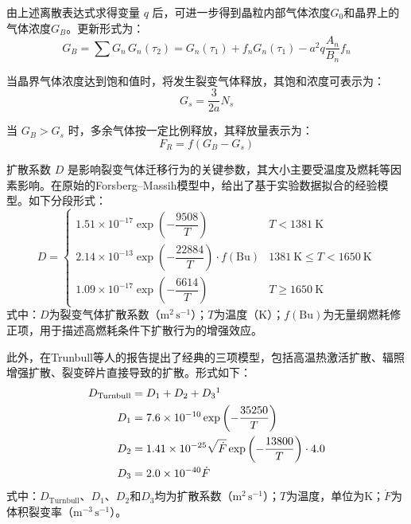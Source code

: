 由上述离散表达式求得变量 $q$ 后，可进一步得到晶粒内部气体浓度$G_0$和晶界上的气体浓度$G_B$。更新形式为：
\begin{equation}
	G_B = \sum G_n \, G_n(\tau_2) = G_n(\tau_1) + f_n G_n(\tau_1) - a^2 q \frac{A_n}{B_n} f_n
\end{equation}

当晶界气体浓度达到饱和值时，将发生裂变气体释放，其饱和浓度可表示为：
\begin{equation}
	G_s = \frac{3}{2a} N_s
\end{equation}

当 $G_B > G_s$ 时，多余气体按一定比例释放，其释放量表示为：
\begin{equation}
	F_R = f \left(G_B - G_s\right)
\end{equation}

扩散系数 $D$ 是影响裂变气体迁移行为的关键参数，其大小主要受温度及燃耗等因素影响。在原始的Forsberg--Massih模型中，给出了基于实验数据拟合的经验模型。如下分段形式：
\begin{equation}
	D =
	\begin{cases}
		1.51\times10^{-17}\exp\left(-\dfrac{9508}{T}\right)                      & T < 1381~\mathrm{K}                     \\
		2.14\times10^{-13}\exp\left(-\dfrac{22884}{T}\right)\cdot f(\mathrm{Bu}) & 1381~\mathrm{K} \le T < 1650~\mathrm{K} \\
		1.09\times10^{-17}\exp\left(-\dfrac{6614}{T}\right)                      & T \ge 1650~\mathrm{K}
	\end{cases}
\end{equation}
\noindent 式中：$D$为裂变气体扩散系数（$\mathrm{m^2\,s^{-1}}$）；$T$为温度（$\mathrm{K}$）；$f(\mathrm{Bu})$为无量纲燃耗修正项，用于描述高燃耗条件下扩散行为的增强效应。

此外，在Trunbull等人\cite{denisSimulationIsothermalFission1996}的报告提出了经典的三项模型，包括高温热激活扩散、辐照增强扩散、裂变碎片直接导致的扩散。形式如下：
\begin{align}
	D_{\mathrm{Turnbull}} & = D_1 + D_2 + D_3\footnotemark                                                    \\
	D_1                   & = 7.6 \times 10^{-10} \exp\left(-\frac{35250}{T}\right)                           \\
	D_2                   & = 1.41 \times 10^{-25} \sqrt{\dot{F}} \exp\left(-\frac{13800}{T}\right) \cdot 4.0 \\
	D_3                   & = 2.0 \times 10^{-40} \dot{F}
\end{align}
\noindent 式中：$D_{\mathrm{Turnbull}}$、$D_1$、$D_2$和$D_3$均为扩散系数（$\mathrm{m^2\,s^{-1}}$）；$T$为温度，单位为$\mathrm{K}$；$\dot{F}$为体积裂变率（$\mathrm{m^{-3}\,s^{-1}}$）。

